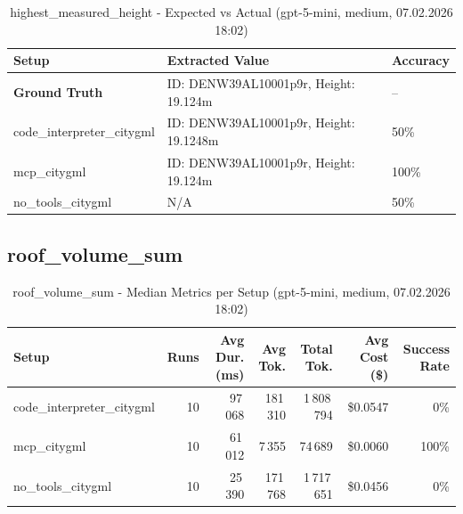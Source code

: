 \documentclass[a4paper,11pt]{article}
\begin{document}
\begin{table}[H]
\centering
\scriptsize
\caption{highest\_measured\_height - Expected vs Actual (gpt-5-mini, medium, 07.02.2026 18:02)}
\begin{tabular}{l l l}
\toprule
Setup & Extracted Value & Accuracy \\
\midrule
\textbf{Ground Truth} & ID: DENW39AL10001p9r, Height: 19.124m & -- \\
\midrule
code\_interpreter\_citygml & ID: DENW39AL10001p9r, Height: 19.1248m & 50\% \\
mcp\_citygml & ID: DENW39AL10001p9r, Height: 19.124m & 100\% \\
no\_tools\_citygml & N/A & 50\% \\
\bottomrule
\end{tabular}
\end{table}

\clearpage

\subsection{roof\_volume\_sum}

\begin{table}[H]
\centering
\scriptsize
\caption{roof\_volume\_sum - Median Metrics per Setup (gpt-5-mini, medium, 07.02.2026 18:02)}
\label{tab:combined\_roof\_volume\_sum\_metrics\_20260207}
\begin{tabular}{l r r r r r r}
\toprule
Setup & Runs & Avg Dur. (ms) & Avg Tok. & Total Tok. & Avg Cost (\$) & Success Rate \\
\midrule
code\_interpreter\_citygml & 10 & 97\,068 & 181\,310 & 1\,808\,794 & \$0.0547 & 0\% \\
mcp\_citygml & 10 & 61\,012 & 7\,355 & 74\,689 & \$0.0060 & 100\% \\
no\_tools\_citygml & 10 & 25\,390 & 171\,768 & 1\,717\,651 & \$0.0456 & 0\% \\
\bottomrule
\end{tabular}
\end{table}
\end{document}
